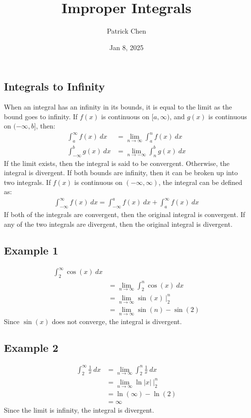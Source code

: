 \documentclass{article}
\title{Improper Integrals}
\author{Patrick Chen}
\date{Jan 8, 2025}
\theoremstyle{mytheoremstyle}
\theoremstyle{mytheoremstyle}
\theoremstyle{myproblemstyle}
\begin{document}
    \maketitle
    \subsection*{Integrals to Infinity}
    When an integral has an infinity in its bounds, it is equal to the limit as
    the bound goes to infinity. If $f(x)$ is continuous on $[a,\infty)$, and
    $g(x)$ is continuous on $(-\infty,b]$, then:
    \begin{align*}
        \int_{a}^{\infty} f(x) \ dx &= \lim_{n\to \infty} \int_{a}^{n} f(x) \ dx \\
        \int_{-\infty}^{b} g(x) \ dx &= \lim_{n\to -\infty} \int_{n}^{b} g(x) \ dx
    \end{align*}
    If the limit exists, then the integral is said to be convergent. Otherwise,
    the integral is divergent. If both bounds are infinity, then it can be
    broken up into two integrals. If $f(x)$ is continuous on $(-\infty,\infty)$,
    the integral can be defined as:
    \begin{align*}
        \int_{-\infty}^{\infty} f(x) \ dx
        = \int_{-\infty}^{a} f(x) \ dx + \int_{a}^{\infty} f(x) \ dx
    \end{align*}
    If both of the integrals are convergent, then the original integral is
    convergent. If any of the two integrals are divergent, then the original
    integral is divergent.

    \subsection*{Example 1}
    \begin{align*}
        \int_{2}^{\infty} \cos(x) \ dx \\
        &= \lim_{n\to \infty} \int_{2}^{n} \cos(x) \ dx \\
        &= \lim_{n\to \infty} \sin(x) \ \Big|_{2}^{n} \\
        &= \lim_{n\to \infty} \sin(n) - \sin(2)
    \end{align*}
    Since $\sin(x)$ does not converge, the integral is divergent.

    \subsection*{Example 2}
    \begin{align*}
        \int_{2}^{\infty} \frac{1}{x} \ dx
        &= \lim_{n\to \infty} \int_{2}^{n} \frac{1}{x} \ dx \\
        &= \lim_{n\to \infty} \ln|x| \ \Big|_{2}^{n} \\
        &= \ln(\infty) - \ln(2) \\
        &= \infty
    \end{align*}
    Since the limit is infinity, the integral is divergent.
\end{document}
